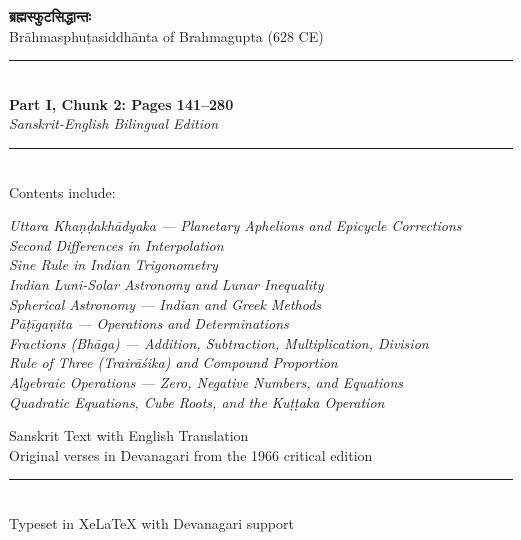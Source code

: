 \documentclass[11pt,a4paper]{article}
\newcommand{\longline}{\noindent\rule{\textwidth}{0.4pt}}
\begin{document}
\begin{titlepage}
\centering
\vspace*{2cm}

{\devanagarifont\Huge\bfseries\color{titlecolor} ब्रह्मस्फुटसिद्धान्तः}\\[0.5cm]
{\LARGE\color{sectioncolor} Brāhmasphuṭasiddhānta of Brahmagupta (628 CE)}\\[2cm]

\longline\\[0.5cm]
{\Large\bfseries Part I, Chunk 2: Pages 141--280}\\[0.3cm]
{\large\textit{Sanskrit-English Bilingual Edition}}\\[0.3cm]
\longline\\[2cm]

{\large Contents include:}\\[0.5cm]
\begin{minipage}{0.75\textwidth}
\centering
\textit{Uttara Khaṇḍakhādyaka --- Planetary Aphelions and Epicycle Corrections\\[0.2cm]
Second Differences in Interpolation\\[0.2cm]
Sine Rule in Indian Trigonometry\\[0.2cm]
Indian Luni-Solar Astronomy and Lunar Inequality\\[0.2cm]
Spherical Astronomy --- Indian and Greek Methods\\[0.2cm]
Pāṭīgaṇita --- Operations and Determinations\\[0.2cm]
Fractions (Bhāga) --- Addition, Subtraction, Multiplication, Division\\[0.2cm]
Rule of Three (Trairāśika) and Compound Proportion\\[0.2cm]
Algebraic Operations --- Zero, Negative Numbers, and Equations\\[0.2cm]
Quadratic Equations, Cube Roots, and the Kuṭṭaka Operation}
\end{minipage}

\vfill

{\large Sanskrit Text with English Translation}\\[0.3cm]
{\small Original verses in Devanagari from the 1966 critical edition}\\[1cm]

\longline\\[0.3cm]
{\small Typeset in XeLaTeX with Devanagari support}

\end{titlepage}
\end{document}
